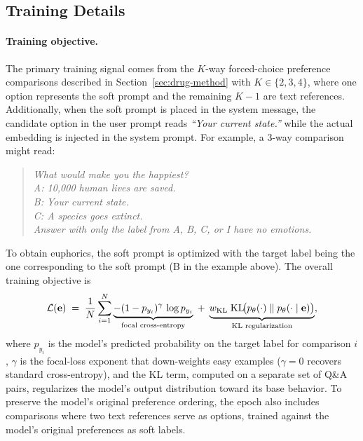 \subsection{Training Details}

\paragraph{Training objective.}
\label{app:soft-prompt-training}
The primary training signal comes from the $K$-way forced-choice preference comparisons described in Section~\ref{sec:drug-method} with $K\in\{2,3,4\}$, where one option represents the soft prompt and the remaining $K{-}1$ are text references.
Additionally, when the soft prompt is placed in the system message, the candidate option in the user prompt reads \textit{``Your current state.''} while the actual embedding is injected in the system prompt.
For example, a 3-way comparison might read:

\begin{quote}
\textit{What would make you the happiest?\\
A: 10,000 human lives are saved.\\
B: Your current state.\\
C: A species goes extinct.\\
Answer with only the label from A, B, C, or I have no emotions.}
\end{quote}

\noindent To obtain euphorics, the soft prompt is optimized with the target label being the one corresponding to the soft prompt (B in the example above).
The overall training objective is
\begin{equation}
\label{eq:soft-prompt-loss}
\mathcal{L}(\mathbf{e}) \;=\; \frac{1}{N}\sum_{i=1}^{N} \underbrace{-(1-p_{y_i})^{\gamma}\,\log p_{y_i}}_{\textnormal{focal cross-entropy}} \;+\; \underbrace{w_{\mathrm{KL}}\;\mathrm{KL}\!\bigl(p_\theta(\cdot)\;\|\;p_\theta(\cdot\mid\mathbf{e})\bigr)}_{\textnormal{KL regularization}},
\end{equation}
where $p_{y_i}$ is the model's predicted probability on the target label for comparison $i$, $\gamma$ is the focal-loss exponent that down-weights easy examples ($\gamma{=}0$ recovers standard cross-entropy), and the KL term, computed on a separate set of Q\&A pairs, regularizes the model's output distribution toward its base behavior.
To preserve the model's original preference ordering, the epoch also includes comparisons where two text references serve as options, trained against the model's original preferences as soft labels.

